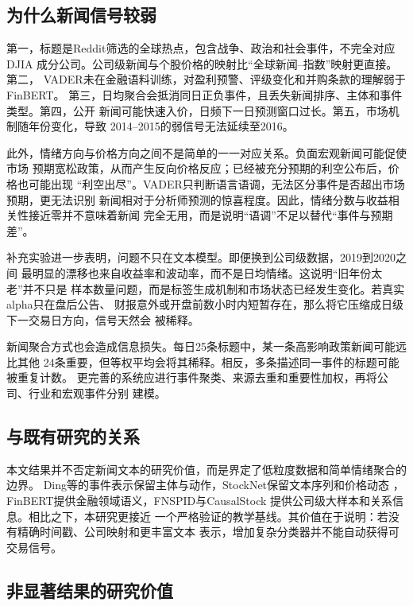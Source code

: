 \documentclass[UTF8,a4paper,10pt,twocolumn,fontset=none]{ctexart}
\begin{document}
\subsection{为什么新闻信号较弱}

第一，标题是Reddit筛选的全球热点，包含战争、政治和社会事件，不完全对应DJIA
成分公司。公司级新闻与个股价格的映射比“全球新闻--指数”映射更直接。第二，
VADER未在金融语料训练，对盈利预警、评级变化和并购条款的理解弱于FinBERT。
第三，日均聚合会抵消同日正负事件，且丢失新闻排序、主体和事件类型。第四，公开
新闻可能快速入价，日频下一日预测窗口过长。第五，市场机制随年份变化，导致
2014--2015的弱信号无法延续至2016。

此外，情绪方向与价格方向之间不是简单的一一对应关系。负面宏观新闻可能促使市场
预期宽松政策，从而产生反向价格反应；已经被充分预期的利空公布后，价格也可能出现
“利空出尽”。VADER只判断语言语调，无法区分事件是否超出市场预期，更无法识别
新闻相对于分析师预测的惊喜程度。因此，情绪分数与收益相关性接近零并不意味着新闻
完全无用，而是说明“语调”不足以替代“事件与预期差”。

补充实验进一步表明，问题不只在文本模型。即便换到公司级数据，2019到2020之间
最明显的漂移也来自收益率和波动率，而不是日均情绪。这说明“旧年份太老”并不只是
样本数量问题，而是标签生成机制和市场状态已经发生变化。若真实alpha只在盘后公告、
财报意外或开盘前数小时内短暂存在，那么将它压缩成日级下一交易日方向，信号天然会
被稀释。

新闻聚合方式也会造成信息损失。每日25条标题中，某一条高影响政策新闻可能远比其他
24条重要，但等权平均会将其稀释。相反，多条描述同一事件的标题可能被重复计数。
更完善的系统应进行事件聚类、来源去重和重要性加权，再将公司、行业和宏观事件分别
建模。

\subsection{与既有研究的关系}

本文结果并不否定新闻文本的研究价值，而是界定了低粒度数据和简单情绪聚合的边界。
Ding等的事件表示保留主体与动作\cite{ding2015}，StockNet保留文本序列和价格动态
\cite{stocknet}，FinBERT提供金融领域语义\cite{finbert}，FNSPID与CausalStock
提供公司级大样本和关系信息\cite{fnspid,causalstock}。相比之下，本研究更接近
一个严格验证的教学基线。其价值在于说明：若没有精确时间戳、公司映射和更丰富文本
表示，增加复杂分类器并不能自动获得可交易信号。

\subsection{非显著结果的研究价值}
\end{document}
